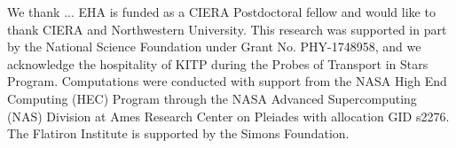 \documentclass[onecolumn, twocolappendix]{aastex631}
\begin{document}




\begin{acknowledgments}
We thank ...
EHA is funded as a CIERA Postdoctoral fellow and would like to thank CIERA and Northwestern University. 
This research was supported in part by the National Science Foundation under Grant No. PHY-1748958, and we acknowledge the hospitality of KITP during the Probes of Transport in Stars Program.
Computations were conducted with support from the NASA High End Computing (HEC) Program through the NASA Advanced Supercomputing (NAS) Division at Ames Research Center on Pleiades with allocation GID s2276.
The Flatiron Institute is supported by the Simons Foundation.
\end{acknowledgments}

\appendix





\newpage


\end{document}

